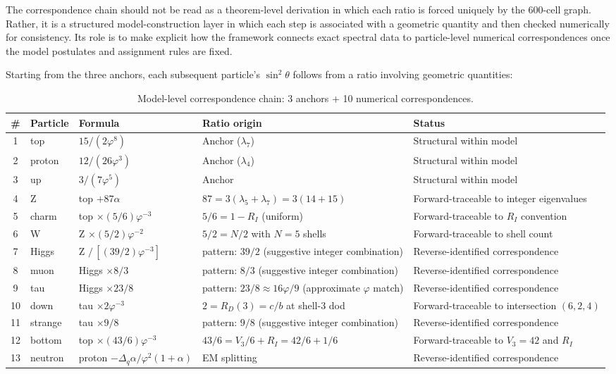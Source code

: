 \documentclass[12pt]{article}
\newcommand{\phig}{\varphi}
\begin{document}
The correspondence chain should not be read as a theorem-level derivation in which each ratio is forced uniquely by the 600-cell graph. Rather, it is a structured model-construction layer in which each step is associated with a geometric quantity and then checked numerically for consistency. Its role is to make explicit how the framework connects exact spectral data to particle-level numerical correspondences once the model postulates and assignment rules are fixed.

Starting from the three anchors, each subsequent particle's $\sin^2\theta$ follows from a ratio involving geometric quantities:

\begin{table}[ht]
\centering
\caption{Model-level correspondence chain: 3 anchors + 10 numerical correspondences.}
\label{tab:chain}
\begin{tabular}{@{}cllll@{}}
\toprule
\# & Particle & Formula & Ratio origin & Status \\
\midrule
1 & top & $15/(2\phig^8)$ & Anchor ($\lambda_7$) & Structural within model \\
2 & proton & $12/(26\phig^3)$ & Anchor ($\lambda_4$) & Structural within model \\
3 & up & $3/(7\phig^5)$ & Anchor & Structural within model \\
4 & Z & top $+ 87\alpha$ & $87 = 3(\lambda_5 + \lambda_7) = 3(14 + 15)$ & Forward-traceable to integer eigenvalues \\
5 & charm & top $\times (5/6)\phig^{-3}$ & $5/6 = 1 - R_I$ (uniform) & Forward-traceable to $R_I$ convention \\
6 & W & Z $\times (5/2)\phig^{-2}$ & $5/2 = N/2$ with $N = 5$ shells & Forward-traceable to shell count \\
7 & Higgs & Z $/\, [(39/2)\phig^{-3}]$ & pattern: $39/2$ (suggestive integer combination) & Reverse-identified correspondence \\
8 & muon & Higgs $\times 8/3$ & pattern: $8/3$ (suggestive integer combination) & Reverse-identified correspondence \\
9 & tau & Higgs $\times 23/8$ & pattern: $23/8 \approx 16\phig/9$ (approximate $\phig$ match) & Reverse-identified correspondence \\
10 & down & tau $\times 2\phig^{-3}$ & $2 = R_D(3) = c/b$ at shell-3 dod & Forward-traceable to intersection $(6,2,4)$ \\
11 & strange & tau $\times 9/8$ & pattern: $9/8$ (suggestive integer combination) & Reverse-identified correspondence \\
12 & bottom & top $\times (43/6)\phig^{-3}$ & $43/6 = V_3/6 + R_I = 42/6 + 1/6$ & Forward-traceable to $V_3 = 42$ and $R_I$ \\
13 & neutron & proton $- \Delta_q \alpha/\phig^2(1{+}\alpha)$ & EM splitting & Reverse-identified correspondence \\
\bottomrule
\end{tabular}
\end{table}
\end{document}

